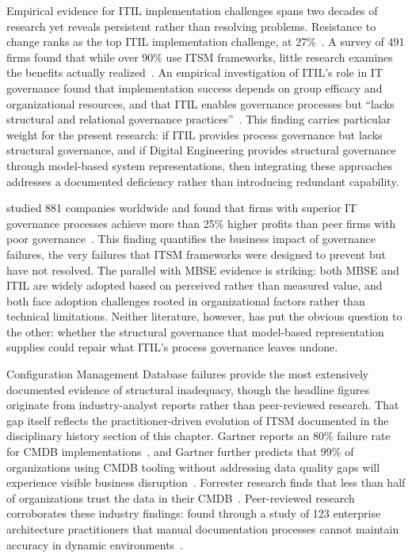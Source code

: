 Empirical evidence for ITIL implementation challenges spans two decades of research yet reveals persistent rather than resolving problems. Resistance to change ranks as the top ITIL implementation challenge, at 27\%~\parencite{Cook_2021}. A survey of 491 firms found that while over 90\% use ITSM frameworks, little research examines the benefits actually realized~\parencite{Marrone_Kolbe_2011}. An empirical investigation of ITIL's role in IT governance found that implementation success depends on group efficacy and organizational resources, and that ITIL enables governance processes but ``lacks structural and relational governance practices''~\parencite{Iden_2014}. This finding carries particular weight for the present research: if ITIL provides process governance but lacks structural governance, and if Digital Engineering provides structural governance through model-based system representations, then integrating these approaches addresses a documented deficiency rather than introducing redundant capability.

\citeauthor{Joshi_2022} studied 881 companies worldwide and found that firms with superior IT governance processes achieve more than 25\% higher profits than peer firms with poor governance~\parencite{Joshi_2022}. This finding quantifies the business impact of governance failures, the very failures that ITSM frameworks were designed to prevent but have not resolved. The parallel with MBSE evidence is striking: both MBSE and ITIL are widely adopted based on perceived rather than measured value, and both face adoption challenges rooted in organizational factors rather than technical limitations. Neither literature, however, has put the obvious question to the other: whether the structural governance that model-based representation supplies could repair what ITIL's process governance leaves undone.

Configuration Management Database failures provide the most extensively documented evidence of structural inadequacy, though the headline figures originate from industry-analyst reports rather than peer-reviewed research. That gap itself reflects the practitioner-driven evolution of ITSM documented in the disciplinary history section of this chapter. Gartner reports an 80\% failure rate for CMDB implementations~\parencite{Gartner_CMDB_2019}, and Gartner further predicts that 99\% of organizations using CMDB tooling without addressing data quality gaps will experience visible business disruption~\parencite{Gartner_CMDB_2020}. Forrester research finds that less than half of organizations trust the data in their CMDB~\parencite{Forrester_CMDB_2020}. Peer-reviewed research corroborates these industry findings: \citeauthor{Hauder_Matthes_Roth_2012} found through a study of 123 enterprise architecture practitioners that manual documentation processes cannot maintain accuracy in dynamic environments~\parencite{Hauder_Matthes_Roth_2012}.

